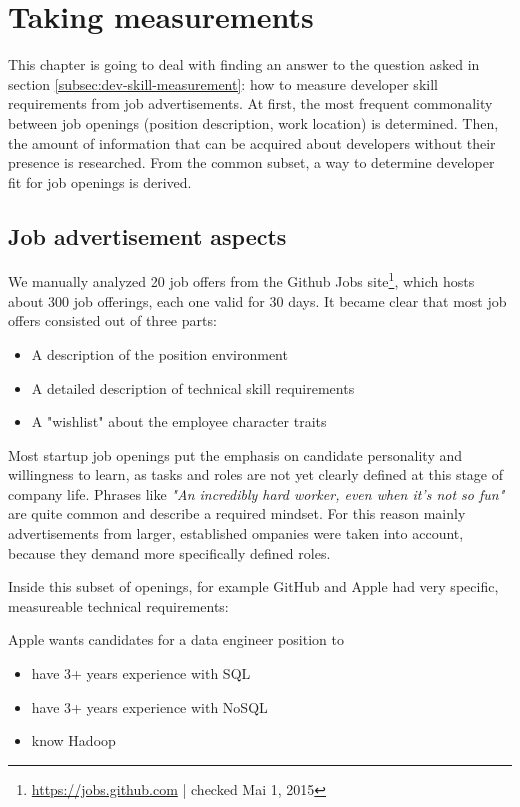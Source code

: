 \chapter{Taking measurements}
This chapter is going to deal with finding an answer to the question asked in section \ref{subsec:dev-skill-measurement}: how to measure developer skill requirements from job advertisements.
At first, the most frequent commonality between job openings (\ie position description, work location) is determined. Then, the amount of information that can be acquired about developers without their presence is researched. From the common subset, a way to determine developer fit for job openings is derived.

\section{Job advertisement aspects}
We manually analyzed 20 job offers from the Github Jobs site\footnote{\url{https://jobs.github.com} | checked Mai 1, 2015}, which hosts about 300 job offerings, each one valid for 30 days. It became clear that most job offers consisted out of three parts:

\begin{itemize}
  \item A description of the position environment
  \item A detailed description of technical skill requirements
  \item A "wishlist" about the employee character traits
\end{itemize}

Most startup job openings put the emphasis on candidate personality and willingness to learn, as tasks and roles are not yet clearly defined at this stage of company life. Phrases like \textit{"An incredibly hard worker, even when it's not so fun"} are quite common and describe a required mindset. For this reason mainly advertisements from larger, established  ompanies were taken into account, because they demand more specifically defined roles.

Inside this subset of openings, for example GitHub and Apple had very specific, measureable technical requirements:
\newline

Apple wants candidates for a data engineer position to
\begin{itemize}
    \item have 3+ years experience with SQL
    \item have 3+ years experience with NoSQL
    \item know Hadoop
\end{itemize}

